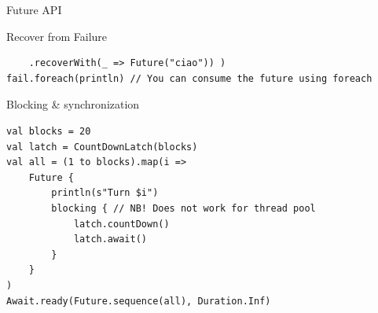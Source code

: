 \documentclass[presentation, 9pt]{beamer}\mode<presentation>{\usetheme{AMSBolognaFC}}
\begin{document}
\begin{frame}{Future API}
\begin{alertblock}{Recover from Failure}
\begin{tcolorbox}[left=0pt, top=0pt, bottom=0pt]
\begin{verbatim}
	.recoverWith(_ => Future("ciao")) )
fail.foreach(println) // You can consume the future using foreach
		\end{verbatim}
	\end{tcolorbox}
\end{alertblock}
\begin{alertblock}{Blocking \& synchronization}
	\begin{tcolorbox}[left=0pt, top=0pt, bottom=0pt]
		\begin{verbatim}
val blocks = 20
val latch = CountDownLatch(blocks)
val all = (1 to blocks).map(i =>
	Future {
		println(s"Turn $i")
		blocking { // NB! Does not work for thread pool
			latch.countDown()
			latch.await()
		}
	}
)
Await.ready(Future.sequence(all), Duration.Inf)
		\end{verbatim}
	\end{tcolorbox}
\end{alertblock}
\end{frame}
\end{document}
